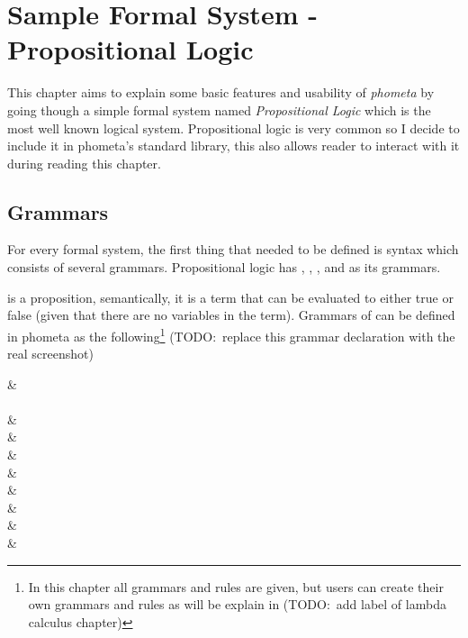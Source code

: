 \documentclass[master.tex]{subfiles}
\begin{document}
\chapter{Sample Formal System - Propositional Logic}
\label{chap:example_propositional_logic}

This chapter aims to explain some basic features and usability of \emph{phometa}
by going though a simple formal system named \emph{Propositional Logic} which is
the most well known logical system. Propositional logic is very common so I
decide to include it in phometa's standard library, this also allows reader to
interact with it during reading this chapter.

\section{Grammars}

For every formal system, the first thing that needed to be defined is syntax
which consists of several grammars. Propositional logic has ,
, , and  as its grammars.

 is a proposition, semantically, it is a term that can be evaluated
to either true or false (given that there are no variables in the term).
Grammars of  can be defined in phometa as the following\footnote{In
  this chapter all grammars and rules are given, but users can create their own
  grammars and rules as will be explain in
  (TODO:\ add label of lambda
  calculus chapter)} (TODO:\ replace this grammar
declaration with the real screenshot)

 {
    \kVarRegex &  \\\\

    \kChoice & \bat{\pifmt{$\top$}} \\

    \kChoice & \bat{\pifmt{$\bot$}} \\

    \kChoice &  \\

    \kChoice &  \\

    \kChoice &  \\

    \kChoice &  \\

    \kChoice &  \\

    \kChoice &  \\
}
\end{document}
